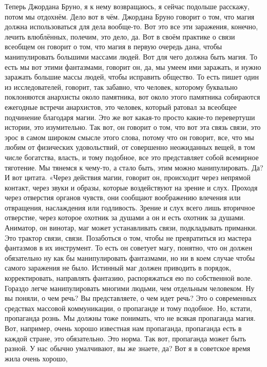 Теперь
Джордана Бруно, я к нему возвращаюсь, я сейчас подольше расскажу, потом мы
отдохнём. Дело вот в чём. Джордана Бруно говорит о том, что магия должна
использоваться для дела вообще-то. Вот это все эти заражения, конечно, лечить
влюблённых, полечим, это дело, да. Вот в своём практике о связи всеобщем он
говорит о том, что магия в первую очередь дана, чтобы манипулировать большими
массами людей. Вот для чего должна быть магия. То есть мы вот этими фантазмами,
говорит он, да, мы умеем ими заражать, и нужно заражать большие массы людей,
чтобы исправить общество. То есть пишет один из исследователей, говорит, так
забавно, что человек, которому буквально поклоняются анархисты около памятника,
вот около этого памятника собираются ежегодные встречи анархистов, это человек,
который ратовал за всеобщее подчинение благодаря магии. Это же вот какая-то
просто какие-то перевертуши истории, это изумительно. Так вот, он говорит о том,
что вот эта связь связи, это эрос в самом широком смысле этого слова, потому что
он говорит, все, что мы любим от физических удовольствий, от совершенно
неожиданных вещей, в том числе богатства, власть, и тому подобное, все это
представляет собой всемирное тяготение. Мы тянемся к чему-то, а стало быть, этим
можно манипулировать. Да? И вот цитата. «Через действия магии, говорит он,
происходит через непрямой контакт, через звуки и образы, которые воздействуют на
зрение и слух. Проходя через отверстия органов чувств, они сообщают воображению
влечения или отвращения, наслаждения или годливость. Зрение и слух всего лишь
вторичное отверстие, через которое охотник за душами а он и есть охотник за
душами. Аниматор, он винотар, маг может устанавливать связи, подкладывать
приманки. Это трактор связи, связи. Позаботься о том, чтобы не превратиться из
мастера фантазмов в их инструмент. То есть он советует магу, понятно, что он
должен обязательно ну как бы манипулировать фантазмами, но ни в коем случае
чтобы самого заражения не было. Истинный маг должен приводить в порядок,
корректировать, направлять фантазию, распоряжаться ею по собственной воле.
Гораздо легче манипулировать многими людьми, чем отдельным человеком. Ну вы
поняли, о чем речь? Вы представляете, о чем идет речь? Это о современных
средствах массовой коммуникации, о пропаганде и тому подобное. Но, кстати,
пропаганда рознь. Мы должны тоже понимать, что не всякая пропаганда магия. Вот,
например, очень хорошо известная нам пропаганда, пропаганда есть в каждой
стране, это обязательно. Это норма. Так вот, пропаганда может быть разной. У нас
обычно умалчивают, вы же знаете, да? Вот я в советское время жила очень хорошо,
